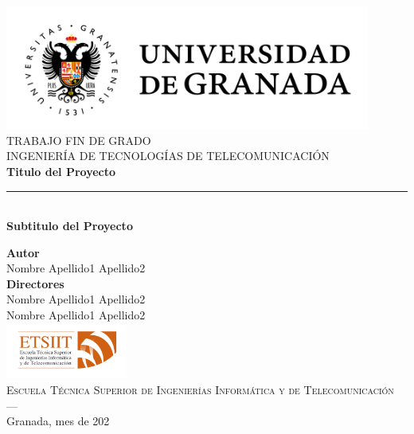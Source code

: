 \begin{titlepage}


\newlength{\centeroffset}
\setlength{\centeroffset}{-0.5\oddsidemargin}
\addtolength{\centeroffset}{0.5\evensidemargin}
\thispagestyle{empty}

\noindent\hspace*{\centeroffset}\begin{minipage}{\textwidth}

\centering
\includegraphics[width=0.9\textwidth]{imagenes/logo_ugr.jpg}\\[1.2cm]

\textsc{ \Large TRABAJO FIN DE GRADO\\[0.2cm]}
\textsc{INGENIERÍA DE TECNOLOGÍAS DE TELECOMUNICACIÓN}\\[1cm]
%
{\Huge\bfseries Titulo del Proyecto\\
}
\noindent\rule[-1ex]{\textwidth}{3pt}\\[3.5ex]
{\large\bfseries Subtitulo del Proyecto}
\end{minipage}

\vspace{2.5cm}
\noindent\hspace*{\centeroffset}\begin{minipage}{\textwidth}
\centering

\textbf{Autor}\\ {Nombre Apellido1 Apellido2}\\[2.5ex]
\textbf{Directores}\\
{Nombre Apellido1 Apellido2\\
Nombre Apellido1 Apellido2}\\[2cm]
\includegraphics[width=0.3\textwidth]{imagenes/etsiit_logo.png}\\[0.1cm]
\textsc{Escuela Técnica Superior de Ingenierías Informática y de Telecomunicación}\\
\textsc{---}\\
Granada, mes de 202
\end{minipage}
\end{titlepage}


